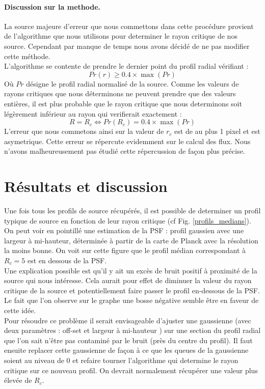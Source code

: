 \documentclass[a4paper,11pt]{article}
\begin{document}
\paragraph{Discussion sur la methode.} La source majeure d'erreur que nous commettons dans cette procédure provient 
de l'algorithme que nous utilisons pour determiner le rayon critique de nos source. Cependant par manque de temps
 nous avons décidé de ne pas modifier cette méthode. \\
 L'algorithme se contente de prendre le dernier point du profil radial vérifiant : 
 \begin{equation}
 Pr(r) \ge 0.4\times \max (Pr)
 \end{equation}
 Où $Pr$ désigne le profil radial normalisé de la source. 
Comme les valeurs de rayons critiques que nous déterminons ne
peuvent prendre que des valeurs entières, il est plus probable que le rayon critique que nous determinons soit légèrement inférieur au 
rayon qui verifierait exactement : 
\begin{equation}
R = R_c \Leftrightarrow Pr(R_c) = 0.4\times \max (Pr)
\end{equation}
L'erreur que nous commetons ainsi sur la valeur de $r_c$ est de au plus 1 pixel et est asymetrique. Cette erreur 
se répercute evidemment sur le calcul des flux. Nous n'avons malheureusement pas étudié cette répercussion de
façon plus précise.



\section{Résultats et discussion}
Une fois tous les profils de source récupérés, il est possible de determiner un profil typique de source
en fonction de leur rayon critique (cf Fig. \ref{profils_medians}). On peut voir en pointillé une estimation de 
la PSF : profil gaussien avec une largeur à mi-hauteur, déterminée à partir de la carte de Planck 
avec la résolution la moins bonne. On voit sur cette figure que le profil médian correspondant à 
$R_c = 5 $ est en dessous de la PSF. \\
Une explication possible est qu'il y ait un excès de bruit positif à proximité de la source qui nous intéresse.
Cela aurait pour effet de diminuer la valeur du rayon critique de la source et potentiellement faire passer 
le profil en-dessous de la PSF. Le fait que l'on observe sur le graphe une bosse négative semble être en faveur
de cette idée. \\
Pour résoudre ce problème il serait envisageable d'ajuster une gaussienne (avec deux
paramètres : off-set et largeur à mi-hauteur ) sur une section du profil radial que l'on sait n'être
pas contaminé par le bruit (près du centre du profil). Il faut ensuite replacer cette gaussienne de façon à ce que les queues de
la gaussienne soient au niveau de 0 et refaire tourner l'algorithme qui determine le rayon critique
sur ce nouveau profil. On devrait normalement récupérer une valeur plus élevée de $R_c$.
\end{document}

